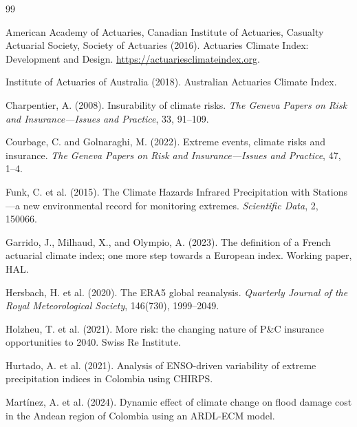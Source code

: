 \documentclass[12pt]{article}
\begin{document}
\begin{thebibliography}{99}
 
American Academy of Actuaries, Canadian Institute of Actuaries, Casualty Actuarial Society, Society of Actuaries (2016).
Actuaries Climate Index: Development and Design.
\url{https://actuariesclimateindex.org}.
 
Institute of Actuaries of Australia (2018).
Australian Actuaries Climate Index.
 
Charpentier, A. (2008).
Insurability of climate risks.
\emph{The Geneva Papers on Risk and Insurance---Issues and Practice}, 33, 91--109.
 
Courbage, C. and Golnaraghi, M. (2022).
Extreme events, climate risks and insurance.
\emph{The Geneva Papers on Risk and Insurance---Issues and Practice}, 47, 1--4.
 
Funk, C. et al. (2015).
The Climate Hazards Infrared Precipitation with Stations---a new environmental record for monitoring extremes.
\emph{Scientific Data}, 2, 150066.
 
Garrido, J., Milhaud, X., and Olympio, A. (2023).
The definition of a French actuarial climate index; one more step towards a European index.
Working paper, HAL.
 
Hersbach, H. et al. (2020).
The ERA5 global reanalysis.
\emph{Quarterly Journal of the Royal Meteorological Society}, 146(730), 1999--2049.
 
Holzheu, T. et al. (2021).
More risk: the changing nature of P\&C insurance opportunities to 2040.
Swiss Re Institute.
 
Hurtado, A. et al. (2021).
Analysis of ENSO-driven variability of extreme precipitation indices in Colombia using CHIRPS.
 
Mart\'inez, A. et al. (2024).
Dynamic effect of climate change on flood damage cost in the Andean region of Colombia using an ARDL-ECM model.
 

\end{thebibliography}
\end{document}
